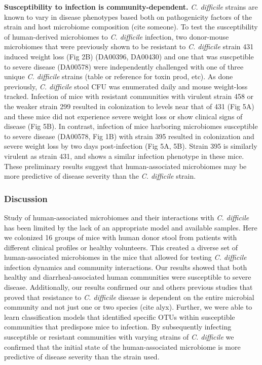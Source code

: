 \documentclass[11pt,]{article}
\begin{document}
\textbf{Susceptibility to infection is community-dependent.} \emph{C.
difficile} strains are known to vary in disease phenotypes based both on
pathogenicity factors of the strain and host microbiome composition
(cite someone). To test the susceptibility of human-derived microbiomes
to \emph{C. difficile} infection, two donor-mouse microbiomes that were
previously shown to be resistant to \emph{C. difficile} strain 431
induced weight loss (Fig 2B) (DA00396, DA00430) and one that was
suscpetible to severe disease (DA00578) were independently challenged
with one of three unique \emph{C. difficile} strains (table or reference
for toxin prod, etc). As done previously, \emph{C. difficile} stool CFU
was enumerated daily and mouse weight-loss tracked. Infection of mice
with resistant communities with virulent strain 458 or the weaker strain
299 resulted in colonization to levels near that of 431 (Fig 5A) and
these mice did not experience severe weight loss or show clinical signs
of disease (Fig 5B). In contrast, infection of mice harboring
microbiomes susceptible to severe disease (DA00578, Fig 1B) with strain
395 resulted in colonization and severe weight loss by two days
post-infection (Fig 5A, 5B). Strain 395 is similarly virulent as strain
431, and shows a similar infection phenotype in these mice. These
preliminary results suggest that human-associated microbiomes may be
more predictive of disease severity than the \emph{C. difficile} strain.

\subsubsection{Discussion}\label{discussion}

Study of human-associated microbiomes and their interactions with
\emph{C. difficile} has been limited by the lack of an appropriate model
and available samples. Here we colonized 16 groups of mice with human
donor stool from patients with different clinical profiles or healthy
volunteers. This created a diverse set of human-associated microbiomes
in the mice that allowed for testing \emph{C. difficile} infection
dynamics and community interactions. Our results showed that both
healthy and diarrheal-associated human communities were susceptible to
severe disease. Additionally, our results confirmed our and others
previous studies that proved that resistance to \emph{C. difficile}
disease is dependent on the entire microbial community and not just one
or two species (cite alyx). Further, we were able to learn
classification models that identified specific OTUs within susceptible
communities that predispose mice to infection. By subsequently infecting
susceptible or resistant communities with varying strains of \emph{C.
difficile} we confirmed that the initial state of the human-associated
microbiome is more predictive of disease severity than the strain used.
\end{document}
